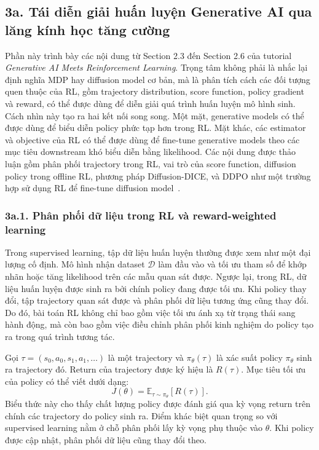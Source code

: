 \graphicspath{{../member2/source_figures/}{member2/source_figures/}{source_figures/}}

\subsection*{3a. Tái diễn giải huấn luyện Generative AI qua lăng kính học tăng cường}

Phần này trình bày các nội dung từ Section 2.3 đến Section 2.6 của tutorial \textit{Generative AI Meets Reinforcement Learning}.
Trọng tâm không phải là nhắc lại định nghĩa MDP hay diffusion model cơ bản, mà là phân tích cách các đối tượng quen thuộc của RL, gồm trajectory distribution, score function, policy gradient và reward, có thể được dùng để diễn giải quá trình huấn luyện mô hình sinh.
Cách nhìn này tạo ra hai kết nối song song.
Một mặt, generative models có thể được dùng để biểu diễn policy phức tạp hơn trong RL.
Mặt khác, các estimator và objective của RL có thể được dùng để fine-tune generative models theo các mục tiêu downstream khó biểu diễn bằng likelihood.
Các nội dung được thảo luận gồm phân phối trajectory trong RL, vai trò của score function, diffusion policy trong offline RL, phương pháp Diffusion-DICE, và DDPO như một trường hợp sử dụng RL để fine-tune diffusion model~\citep{eysenbach2025generativerl}.

\subsubsection*{3a.1. Phân phối dữ liệu trong RL và reward-weighted learning}

Trong supervised learning, tập dữ liệu huấn luyện thường được xem như một đại lượng cố định.
Mô hình nhận dataset $\mathcal{D}$ làm đầu vào và tối ưu tham số để khớp nhãn hoặc tăng likelihood trên các mẫu quan sát được.
Ngược lại, trong RL, dữ liệu huấn luyện được sinh ra bởi chính policy đang được tối ưu.
Khi policy thay đổi, tập trajectory quan sát được và phân phối dữ liệu tương ứng cũng thay đổi.
Do đó, bài toán RL không chỉ bao gồm việc tối ưu ánh xạ từ trạng thái sang hành động, mà còn bao gồm việc điều chỉnh phân phối kinh nghiệm do policy tạo ra trong quá trình tương tác.

Gọi $\tau=(s_0,a_0,s_1,a_1,\ldots)$ là một trajectory và $\pi_\theta(\tau)$ là xác suất policy $\pi_\theta$ sinh ra trajectory đó.
Return của trajectory được ký hiệu là $R(\tau)$.
Mục tiêu tối ưu của policy có thể viết dưới dạng:
\begin{equation}
    J(\theta)
    =
    \mathbb{E}_{\tau\sim\pi_\theta}
    \left[
        R(\tau)
    \right].
\end{equation}
Biểu thức này cho thấy chất lượng policy được đánh giá qua kỳ vọng return trên chính các trajectory do policy sinh ra.
Điểm khác biệt quan trọng so với supervised learning nằm ở chỗ phân phối lấy kỳ vọng phụ thuộc vào $\theta$.
Khi policy được cập nhật, phân phối dữ liệu cũng thay đổi theo.

